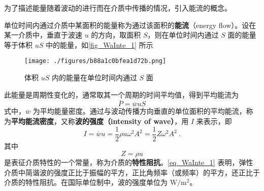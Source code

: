 
\begin{issues}
\end{issues}


为了描述能量随着波动的进行而在介质中传播的情况，引入能流的概念。

单位时间内通过介质中某面积的能量称为通过该面积的\textbf{能流}（energy flow）。设在某一介质中，垂直于波速 $u$ 的方向，取面积 $S$，则在单位时间内通过 $S$ 面的能量等于体积 $uS$ 中的能量，如\autoref{fig_WaInte_1} 所示
\begin{figure}[ht]
\centering
\texttt{[image: ./figures/b88a1c0bfea1d72b.png]}
\caption{体积 $uS$ 内的能量在单位时间内通过 $S$ 面} \label{fig_WaInte_1}
\end{figure}

此能量是周期性变化的，通常取其一个周期的时间平均值，得到平均能流为
\begin{equation}
\overline{P}=\overline{w} u S
\end{equation}
式中，$\overline w$ 为平均能量密度。通过与波动传播方向垂直的单位面积的平均能流，称为\textbf{平均能流密度}，又称\textbf{波的强度（intensity of wave）}，用 $I$ 来表示，即
\begin{equation} \label{eq_WaInte_1}
I=\overline{w} u=\frac{1}{2} \rho u \omega^{2} A^{2}=\frac{1}{2} Z \omega^{2} A^{2}~.
\end{equation}
其中
\begin{equation}
Z=\rho u
\end{equation}
是表征介质特性的一个常量，称为介质的\textbf{特性阻抗}。\autoref{eq_WaInte_1} 表明，弹性介质中简谐波的强度正比于振幅的平方，正比角频率（或频率）的平方，还正比于介质的特性阻抗。在国际单位制中，波的强度单位为 $\mathrm{W}/\mathrm{m^2}$。